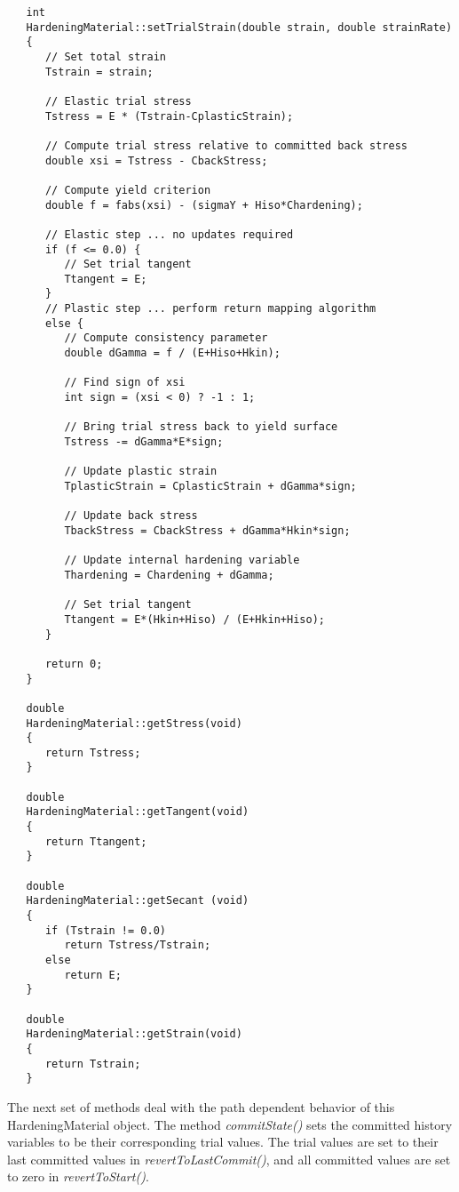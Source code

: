 \documentclass[12pt]{article}
\begin{document}
{\sf\small
\begin{verbatim}
   int 
   HardeningMaterial::setTrialStrain(double strain, double strainRate)
   {
      // Set total strain
      Tstrain = strain;
    
      // Elastic trial stress
      Tstress = E * (Tstrain-CplasticStrain);
    
      // Compute trial stress relative to committed back stress
      double xsi = Tstress - CbackStress;

      // Compute yield criterion
      double f = fabs(xsi) - (sigmaY + Hiso*Chardening);
    
      // Elastic step ... no updates required
      if (f <= 0.0) {
         // Set trial tangent
         Ttangent = E;
      }
      // Plastic step ... perform return mapping algorithm
      else {
         // Compute consistency parameter
         double dGamma = f / (E+Hiso+Hkin);
   
         // Find sign of xsi
         int sign = (xsi < 0) ? -1 : 1;

         // Bring trial stress back to yield surface
         Tstress -= dGamma*E*sign;
	
         // Update plastic strain
         TplasticStrain = CplasticStrain + dGamma*sign;
	
         // Update back stress
         TbackStress = CbackStress + dGamma*Hkin*sign;
	
         // Update internal hardening variable
         Thardening = Chardening + dGamma;
	
         // Set trial tangent
         Ttangent = E*(Hkin+Hiso) / (E+Hkin+Hiso);
      }

      return 0;
   }

   double 
   HardeningMaterial::getStress(void)
   {
      return Tstress;
   }

   double 
   HardeningMaterial::getTangent(void)
   {
      return Ttangent;
   }

   double
   HardeningMaterial::getSecant (void)
   {
      if (Tstrain != 0.0)
         return Tstress/Tstrain;
      else
         return E;
   }

   double 
   HardeningMaterial::getStrain(void)
   {
      return Tstrain;
   }
\end{verbatim}
}

\noindent The next set of methods deal with the path dependent behavior of this
HardeningMaterial object. The method {\em commitState()} sets the committed history variables
to be their corresponding trial values. The trial values are set to their last committed
values in {\em revertToLastCommit()}, and all committed values are set to zero in {\em revertToStart()}.
\end{document}

